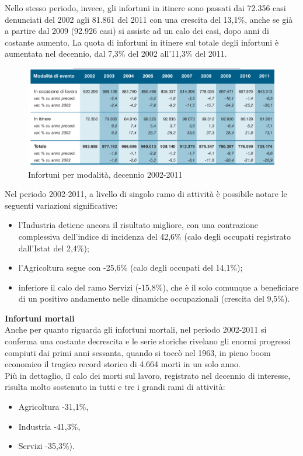 Nello stesso periodo, invece, gli infortuni in itinere sono passati dai 72.356 casi denunciati del 2002 agli 81.861 del 2011 con una crescita del 13,1\%, anche se già a partire dal 2009 (92.926 casi) si assiste ad un calo dei casi, dopo anni di costante aumento.
La quota di infortuni in itinere sul totale degli infortuni è aumentata nel decennio, dal 7,3\% del 2002 all'11,3\% del 2011.


\begin{figure}[H]
\centering
\includegraphics[scale=0.55]{images/cap4/analisiDiMercato/infortuniDecennioPerModalita}
\caption{Infortuni per modalità, decennio 2002-2011}
\end{figure}




Nel periodo 2002-2011, a livello di singolo ramo di attività è possibile notare le seguenti variazioni significative:
\begin{itemize}
\item l'Industria detiene ancora il risultato migliore, con una contrazione complessiva dell'indice di incidenza del 42,6\% (calo degli occupati registrato dall'Istat del 2,4\%);
\item l'Agricoltura segue con -25,6\% (calo degli occupati del 14,1\%);
\item inferiore il calo del ramo Servizi (-15,8\%), che è il solo comunque a beneficiare di un positivo andamento nelle dinamiche occupazionali (crescita del 9,5\%).\\
\end{itemize}


\textbf{Infortuni mortali}\\
Anche per quanto riguarda gli infortuni mortali, nel periodo 2002-2011 si conferma una costante decrescita e le serie storiche rivelano gli enormi progressi compiuti dai primi anni sessanta, quando si toccò nel 1963, in pieno boom economico il tragico record storico di 4.664 morti in un solo anno.\\
Più in dettaglio, il calo dei morti sul lavoro, registrato nel decennio di interesse, risulta molto sostenuto in tutti e tre i grandi rami di attività:
\begin{itemize}
\item Agricoltura -31,1\%,
\item Industria -41,3\%,
\item Servizi -35,3\%).
\end{itemize}

